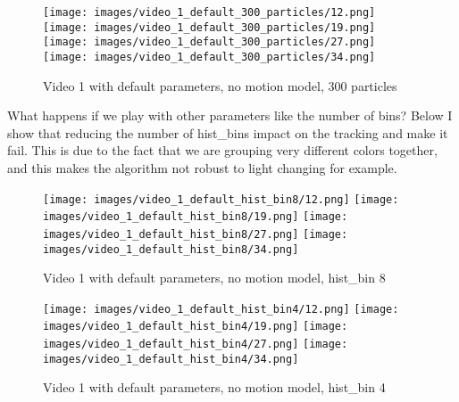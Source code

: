 \documentclass{ETHExercise}
\begin{document}
\begin{figure}[!h]
    \texttt{[image: images/video\_1\_default\_300\_particles/12.png]}
  \endminipage
    \texttt{[image: images/video\_1\_default\_300\_particles/19.png]}
  \endminipage
    \texttt{[image: images/video\_1\_default\_300\_particles/27.png]}
  \endminipage\space
    \texttt{[image: images/video\_1\_default\_300\_particles/34.png]}
  \endminipage
  \caption{Video 1 with default parameters, no motion model, 300 particles}
\end{figure}

\newpage
What happens if we play with other parameters like the number
of bins? Below I show that reducing the number of hist\_bins impact
on the tracking and make it fail. This is due to the fact that we are 
grouping very different colors together, and this makes the algorithm 
not robust to light changing for example.

\begin{figure}[!h]
    \texttt{[image: images/video\_1\_default\_hist\_bin8/12.png]}
  \endminipage
    \texttt{[image: images/video\_1\_default\_hist\_bin8/19.png]}
  \endminipage
    \texttt{[image: images/video\_1\_default\_hist\_bin8/27.png]}
  \endminipage\space
    \texttt{[image: images/video\_1\_default\_hist\_bin8/34.png]}
  \endminipage
  \caption{Video 1 with default parameters, no motion model, hist\_bin 8}
\end{figure}

\begin{figure}[!h]
    \texttt{[image: images/video\_1\_default\_hist\_bin4/12.png]}
  \endminipage
    \texttt{[image: images/video\_1\_default\_hist\_bin4/19.png]}
  \endminipage
    \texttt{[image: images/video\_1\_default\_hist\_bin4/27.png]}
  \endminipage\space
    \texttt{[image: images/video\_1\_default\_hist\_bin4/34.png]}
  \endminipage
  \caption{Video 1 with default parameters, no motion model, hist\_bin 4}
\end{figure}
\end{document}
